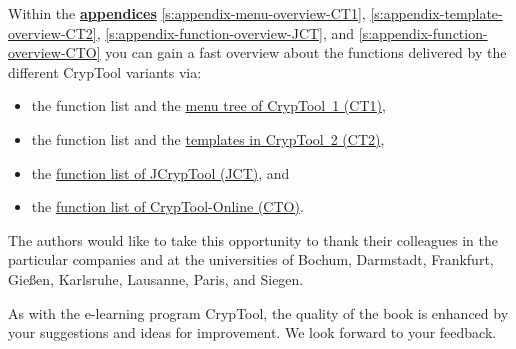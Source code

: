 Within the \hyperlink{appendix-start}{\bf appendices}
\ref{s:appendix-menu-overview-CT1},
\ref{s:appendix-template-overview-CT2},
\ref{s:appendix-function-overview-JCT}, and
\ref{s:appendix-function-overview-CTO}
you can gain a fast overview about the functions delivered by the different
CrypTool variants via:
\begin{itemize}
  \item the function list and
        the \hyperlink{appendix-menu-overview-CT1}
                      {menu tree of CrypTool~1 (CT1)},
  \item the function list and
        the \hyperlink{appendix-template-overview-CT2}
                      {templates in CrypTool~2 (CT2)},
  \item the \hyperlink{appendix-function-overview-JCT}
                      {function list of JCrypTool (JCT)}, and
  \item the \hyperlink{appendix-function-overview-CTO}
                      {function list of CrypTool-Online (CTO)}.
\end{itemize}

The authors would like to take this opportunity to thank their colleagues
in the particular companies and at the universities of Bochum, Darmstadt,
Frankfurt, Gie\ss en, Karlsruhe, Lausanne, Paris, and Siegen.

\enlargethispage{12pt}
As with the e-learning program CrypTool, the quality of the
book is enhanced by your suggestions and ideas for improvement.
We look forward to your feedback.


